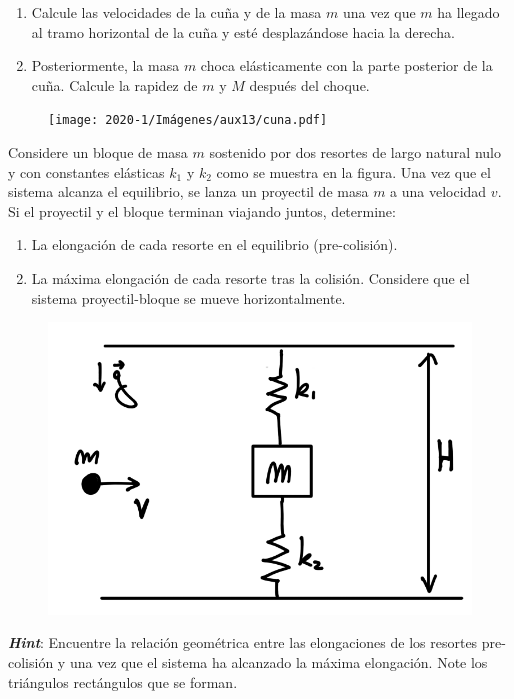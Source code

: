 \documentclass[letterpaper,11pt]{article}
\begin{document}
\begin{enumerate}
\begin{multicols}{2}
    \begin{enumerate}
        \item Calcule las velocidades de la cuña y de la masa $m$ una vez que $m$ ha llegado al tramo horizontal de la cuña y esté desplazándose hacia la derecha.
        
        \item Posteriormente, la masa $m$ choca elásticamente con la parte posterior de la cuña. Calcule la rapidez de $m$ y $M$ después del choque.
    \end{enumerate}
    
    \columnbreak
    
    \begin{figure}[H]
        \centering
        \texttt{[image: 2020-1/Imágenes/aux13/cuna.pdf]}
    \end{figure}
\end{multicols}

\begin{multicols}{2}
    \item Considere un bloque de masa $m$ sostenido por dos resortes de largo natural nulo y con constantes elásticas $k_1$ y $k_2$ como se muestra en la figura. Una vez que el sistema alcanza el equilibrio, se lanza un proyectil de masa $m$ a una velocidad $v$. Si el proyectil y el bloque terminan viajando juntos, determine:

    \begin{enumerate}
        \item La elongación de cada resorte en el equilibrio (pre-colisión).
        
        \item La máxima elongación de cada resorte tras la colisión. Considere que el sistema proyectil-bloque se mueve horizontalmente.
    \end{enumerate}
    
    \columnbreak
    
    \begin{figure}[H]
        \centering
        \includegraphics[width=0.9\linewidth]{2023-1/img/aux_11/p3c2.png}
    \end{figure}
\end{multicols}
\textbf{\textit{Hint}}: Encuentre la relación geométrica entre las elongaciones de los resortes pre-colisión y una vez que el sistema ha alcanzado la máxima elongación. Note los triángulos rectángulos que se forman.  


\end{enumerate}
\end{document}
